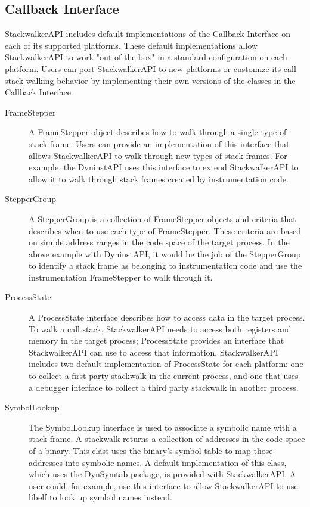\subsection{Callback Interface}
StackwalkerAPI includes default implementations of the Callback Interface on
each of its supported platforms. These default implementations allow
StackwalkerAPI to work "out of the box" in a standard configuration on each
platform. Users can port StackwalkerAPI to new platforms or customize its call
stack walking behavior by implementing their own versions of the classes in the
Callback Interface.

\begin{description}
\item [FrameStepper] A FrameStepper object describes how to walk through a
    single type of stack frame. Users can provide an implementation of this
    interface that allows StackwalkerAPI to walk through new types of stack
    frames. For example, the DyninstAPI uses this interface to extend
    StackwalkerAPI to allow it to walk through stack frames created by
    instrumentation code.

\item [StepperGroup] A StepperGroup is a collection of FrameStepper objects and
    criteria that describes when to use each type of FrameStepper. These
    criteria are based on simple address ranges in the code space of the target
    process. In the above example with DyninstAPI, it would be the job of the
    StepperGroup to identify a stack frame as belonging to instrumentation code
    and use the instrumentation FrameStepper to walk through it.

\item [ProcessState] A ProcessState interface describes how to access data in
    the target process. To walk a call stack, StackwalkerAPI needs to access
    both registers and memory in the target process; ProcessState provides an
    interface that StackwalkerAPI can use to access that information.
    StackwalkerAPI includes two default implementation of ProcessState for each
    platform: one to collect a first party stackwalk in the current process, and
    one that uses a debugger interface to collect a third party stackwalk in
    another process.

\item [SymbolLookup] The SymbolLookup interface is used to associate a symbolic
    name with a stack frame. A stackwalk returns a collection of addresses in
    the code space of a binary. This class uses the binary's symbol table to map
    those addresses into symbolic names. A default implementation of this class,
    which uses the DynSymtab package, is provided with StackwalkerAPI. A user
    could, for example, use this interface to allow StackwalkerAPI to use libelf
    to look up symbol names instead.
\end{description}
